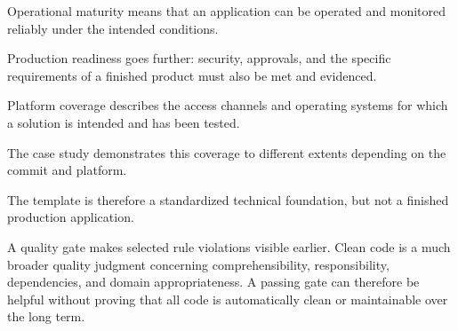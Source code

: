 \begin{beginnerstatement}

Operational maturity means that an application can be operated and monitored
reliably under the intended conditions.

Production readiness goes further: security, approvals, and the specific
requirements of a finished product must also be met and evidenced.

Platform coverage describes the access channels and operating systems for
which a solution is intended and has been tested.

The case study demonstrates this coverage to different extents depending on
the commit and platform.

The template is therefore a standardized technical foundation, but not a
finished production application.

A quality gate makes selected rule violations visible earlier. Clean code is a
much broader quality judgment concerning comprehensibility, responsibility,
dependencies, and domain appropriateness. A passing gate can therefore be
helpful without proving that all code is automatically clean or maintainable
over the long term.

\end{beginnerstatement}
